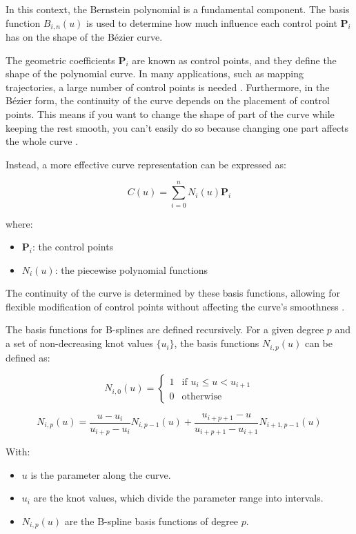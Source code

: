 In this context, the Bernstein polynomial is a fundamental component. 
The basis function \( B_{i,n}(u) \) is used to determine how much influence each control 
point \( \mathbf{P}_i \) has on the shape of the Bézier curve.

The geometric coefficients \( \mathbf{P}_i \) are known as control points, and they define 
the shape of the polynomial curve. In many applications, such as mapping trajectories, 
a large number of control points is needed \cite{R28}.
Furthermore, in the Bézier form, the continuity of the curve depends on the placement of 
control points. This means if you want to change the shape of part of the curve while keeping 
the rest smooth, you can't easily do so because changing one part affects the whole curve \cite{R29}.

Instead, a more effective curve representation can be expressed as:

\begin{equation}
    C(u) = \sum_{i=0}^{n} N_i(u) \mathbf{P}_i
\end{equation}

where:
\begin{itemize}
    \item \( \mathbf{P}_i \): the control points
    \item \( N_i(u) \): the piecewise polynomial functions
\end{itemize}
The continuity of the curve is determined by these basis functions, allowing for flexible modification of 
control points without affecting the curve's smoothness \cite{R29}.

The basis functions for B-splines are defined recursively. For a given degree \( p \) and a set of non-decreasing knot values 
\( \{ u_i \} \), the basis functions \( N_{i,p}(u) \) can be defined as:

\begin{equation}
    N_{i,0}(u) = 
\begin{cases} 
1 & \text{if } u_i \leq u < u_{i+1} \\
0 & \text{otherwise}
\end{cases}
\end{equation}

\begin{equation}
N_{i,p}(u) = \frac{u - u_i}{u_{i+p} - u_i} N_{i,p-1}(u) + \frac{u_{i+p+1} - u}{u_{i+p+1} - u_{i+1}} N_{i+1,p-1}(u)
\end{equation}


With:
\begin{itemize}
    \item \( u \) is the parameter along the curve.
    \item \( u_i \) are the knot values, which divide the parameter range into intervals.
    \item \( N_{i,p}(u) \) are the B-spline basis functions of degree \( p \).
\end{itemize}

